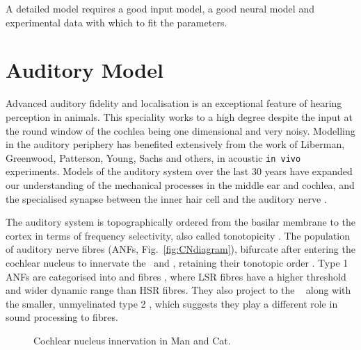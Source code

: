 
A detailed \BNN model requires a good input model, a good neural model and
experimental data with which to fit the parameters.  

\section{Auditory Model    \label{sec:CN:auditory-model}}

Advanced auditory fidelity and localisation is an exceptional feature of hearing
perception in animals.  This speciality works to a high degree despite the input
at the round window of the cochlea being one dimensional and very noisy.
Modelling in the auditory periphery has benefited extensively from the work of
Liberman, Greenwood, Patterson, Young, Sachs and others, in acoustic \texttt{in
  vivo} experiments. Models of the auditory system over the last 30 years have
expanded our understanding of the mechanical processes in the middle ear and
cochlea, and the specialised synapse between the inner hair cell and the
auditory nerve \citep{DavisVoigt:1991,Carney:1993,MeddisHewittEtAl:1990}.


The auditory system is topographically ordered from the basilar membrane to the
cortex in terms of frequency selectivity, also called tonotopicity
\citep{YoungOertel:2004}.  The population of auditory nerve fibres (ANFs,
Fig.~\ref{fig:CNdiagram}), bifurcate after entering the cochlear nucleus to
innervate the \VCN~and \DCN\@, retaining their tonotopic order
\citep{Lorente:1981, Liberman:1982, Liberman:1993}. Type 1 ANFs are categorised
into {\HSR} and {\LSR} fibres \citep{Liberman:1978}, where LSR fibres have a
higher threshold and wider dynamic range than HSR fibres. They also project to
the \GCD~\citep{RyugoParks:2003, RyugoHaenggeliEtAl:2003} along with the
smaller, unmyelinated type 2 \ANFs, which suggests they play a different role in
sound processing to \HSR fibres.


\begin{figure}[htb]
  \begin{center}
    \caption[Cochlear nucleus innervation in Man and Cat.]{Cochlear nucleus
      innervation in Man and Cat. \citep[!find out which publication printed
      this!]{RyugoParks:2003,Ryugo:1992,Spoendlin:1973}}
    \label{fig:CN_Cat_Human}
  \end{center}
\end{figure}



